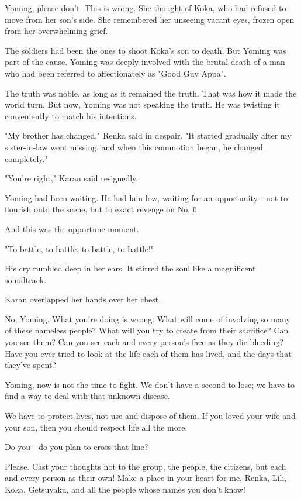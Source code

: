Yoming, please don't. This is wrong. She thought of Koka, who had
refused to move from her son's side. She remembered her unseeing vacant
eyes, frozen open from her overwhelming grief.

The soldiers had been the ones to shoot Koka's son to death. But Yoming
was part of the cause. Yoming was deeply involved with the brutal death
of a man who had been referred to affectionately as "Good Guy Appa".

The truth was noble, as long as it remained the truth. That was how it
made the world turn. But now, Yoming was not speaking the truth. He was
twisting it conveniently to match his intentions.

"My brother has changed," Renka said in despair. "It started gradually
after my sister-in-law went missing, and when this commotion began, he
changed completely."

"You're right," Karan said resignedly.

Yoming had been waiting. He had lain low, waiting for an opportunity―not
to flourish onto the scene, but to exact revenge on No. 6.

And this was the opportune moment.

"To battle, to battle, to battle, to battle!"

His cry rumbled deep in her ears. It stirred the soul like a magnificent
soundtrack.

Karan overlapped her hands over her chest.

No, Yoming. What you're doing is wrong. What will come of involving so
many of these nameless people? What will you try to create from their
sacrifice? Can you see them? Can you see each and every person's face as
they die bleeding? Have you ever tried to look at the life each of them
has lived, and the days that they've spent?

Yoming, now is not the time to fight. We don't have a second to lose; we
have to find a way to deal with that unknown disease.

We have to protect lives, not use and dispose of them. If you loved your
wife and your son, then you should respect life all the more.

Do you―do you plan to cross that line?

Please. Cast your thoughts not to the group, the people, the citizens,
but each and every person as their own! Make a place in your heart for
me, Renka, Lili, Koka, Getsuyaku, and all the people whose names you
don't know!

